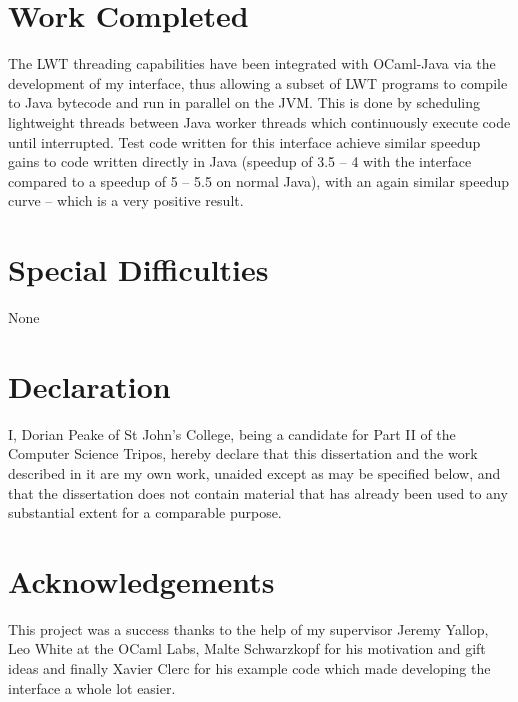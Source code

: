 \documentclass[12pt,twoside,notitlepage]{report}
\begin{document}
\section*{Work Completed}
The LWT threading capabilities have been integrated with OCaml-Java via the development of my interface, thus allowing a subset of LWT programs to compile to Java bytecode and run in parallel on the JVM. This is done by scheduling
lightweight threads between Java worker threads which continuously execute code until interrupted. Test code written for this interface achieve similar speedup gains to code written directly in Java (speedup of 3.5 -- 4 with the
interface compared to a speedup of 5 -- 5.5 on normal Java), with an again similar speedup curve -- which is a very positive result. 

\section*{Special Difficulties}
None

\newpage
\section*{Declaration}

I, Dorian Peake of St John's College, being a candidate for Part II of the Computer
Science Tripos, hereby declare
that this dissertation and the work described in it are my own work,
unaided except as may be specified below, and that the dissertation
does not contain material that has already been used to any substantial
extent for a comparable purpose.

\bigskip
\bigskip
\bigskip
{}

\bigskip
\bigskip
\bigskip
{}

\cleardoublepage

\tableofcontents

\listoffigures

\newpage
\section*{Acknowledgements}
This project was a success thanks to the help of my supervisor Jeremy Yallop, Leo White at the OCaml Labs, Malte Schwarzkopf for his motivation and gift ideas and finally Xavier Clerc for his example code which made developing the
interface a whole lot easier.
\end{document}
